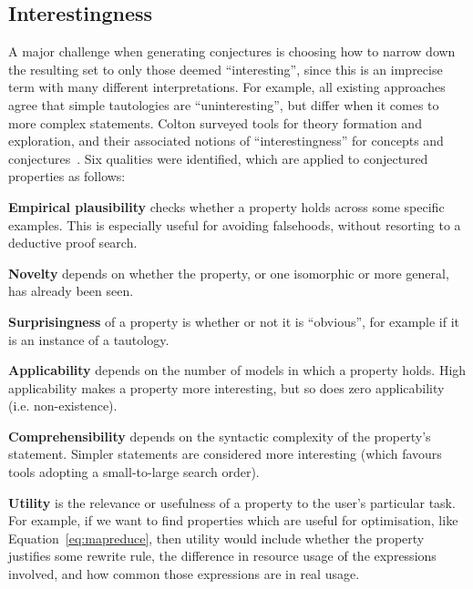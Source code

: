 \subsection{Interestingness}

A major challenge when generating conjectures is choosing how to narrow down the
resulting set to only those deemed ``interesting'', since this is an imprecise
term with many different interpretations. For example, all existing approaches
agree that simple tautologies are ``uninteresting'', but differ when it comes to
more complex statements.  Colton \etal{} surveyed tools for theory formation
and exploration, and their associated notions of ``interestingness'' for
concepts and conjectures~\cite{colton2000notion}. Six qualities were identified,
which are applied to conjectured properties as follows:

{\bf Empirical plausibility} checks whether a property holds across some
specific examples. This is especially useful for avoiding falsehoods, without
resorting to a deductive proof search.

{\bf Novelty} depends on whether the property, or one isomorphic or more
general, has already been seen.

{\bf Surprisingness} of a property is whether or not it is ``obvious'', for
example if it is an instance of a tautology.

{\bf Applicability} depends on the number of models in which a
property holds. High applicability makes a property more interesting, but so
does zero applicability (i.e. non-existence).

{\bf Comprehensibility} depends on the syntactic complexity of the property's
statement. Simpler statements are considered more interesting (which favours
tools adopting a small-to-large search order).

{\bf Utility} is the relevance or usefulness of a property to the user's
particular task. For example, if we want to find properties which are useful for
optimisation, like Equation~\ref{eq:mapreduce}, then utility would include
whether the property justifies some rewrite rule, the difference in resource
usage of the expressions involved, and how common those expressions are in real
usage.

